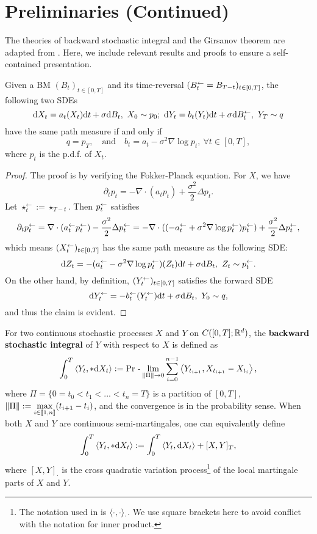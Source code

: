 \section{Preliminaries (Continued)}
\label{app:pre}
The theories of backward stochastic integral and the Girsanov theorem are adapted from \cite{vargas2024transport}. Here, we include relevant results and proofs to ensure a self-contained presentation.  

\begin{lemma}
    \label{lem:nelson}
    Given a BM $(B_t)_{t\in[0,T]}$ and its time-reversal $(B^\gets_t=B_{T-t})_{t\in[0,T]}$, the following two SDEs
    $$\mathrm{d} X_t=a_t(X_t)\mathrm{d} t+\sigma\mathrm{d} B_t,~X_0\sim p_0;~\mathrm{d} Y_t=b_t(Y_t)\mathrm{d} t+\sigma\mathrm{d}B^\gets_t,~Y_T\sim q$$
    have the same path measure if and only if
    $$q=p_T,\quad\text{and}\quad b_t=a_t-\sigma^2\nabla\log p_t,~\forall t\in[0,T],$$
    where $p_t$ is the p.d.f. of $X_t$.
\end{lemma}

\begin{proof}
    The proof is by verifying the Fokker-Planck equation. For $X$, we have
    $$\partial_tp_t=-\nabla\cdot(a_tp_t)+\frac{\sigma^2}{2}\Delta p_t.$$
    Let $\star^\gets_t:=\star_{T-t}$. Then $p^\gets_t$ satisfies
    $$\partial_tp^\gets_t=\nabla\cdot(a^\gets_tp^\gets_t)-\frac{\sigma^2}{2}\Delta p^\gets_t=-\nabla\cdot((-a^\gets_t+\sigma^2\nabla\log p^\gets_t)p^\gets_t)+\frac{\sigma^2}{2}\Delta p^\gets_t,$$
    which means $(X^\gets_t)_{t\in[0,T]}$ has the same path measure as the following SDE:
    $$\mathrm{d} Z_t=-(a^\gets_t-\sigma^2\nabla\log p^\gets_t)(Z_t)\mathrm{d} t+\sigma\mathrm{d} B_t,~Z_t\sim p^\gets_t.$$
    On the other hand, by definition, $(Y^\gets_t)_{t\in[0,T]}$ satisfies the forward SDE
    $$\mathrm{d}Y^\gets_t=-b^\gets_t(Y^\gets_t)\mathrm{d} t+\sigma\mathrm{d} B_t,~Y_0\sim q,$$
    and thus the claim is evident.
\end{proof}

\begin{definition}
    \label{def:bsi}
    For two continuous stochastic processes $X$ and $Y$ on $C([0,T];\mathbb{R}^d)$, the \textbf{backward stochastic integral} of $Y$ with respect to $X$ is defined as
    $$\int_0^T\left\langle Y_t,*\mathrm{d} X_t\right\rangle:=\operatorname{Pr}\,{\text-}\lim_{\|\Pi\|\to0}\sum_{i=0}^{n-1}\left\langle Y_{t_{i+1}},X_{t_{i+1}}-X_{t_i}\right\rangle,$$
    where $\Pi=\{0=t_0<t_1<...<t_n=T\}$ is a partition of $[0,T]$, $\|\Pi\|:=\max\limits_{i\in\left[\!\left[1,n\right]\!\right]}(t_{i+1}-t_i)$, and the convergence is in the probability sense. When both $X$ and $Y$ are continuous semi-martingales, one can equivalently define
    \begin{equation}
        \int_0^T\left\langle Y_t,*\mathrm{d} X_t\right\rangle:=\int_0^T\left\langle Y_t,\mathrm{d} X_t\right\rangle+[X,Y]_T,
        \label{eq:bsi_ito}
    \end{equation}
    where $[X,Y]_\cdot$ is the cross quadratic variation process\footnote{The notation used in \cite{karatzas1991brownian} is $\left\langle\cdot,\cdot\right\rangle_\cdot$. We use square brackets here to avoid conflict with the notation for inner product.} of the local martingale parts of $X$ and $Y$.
    \end{definition}

